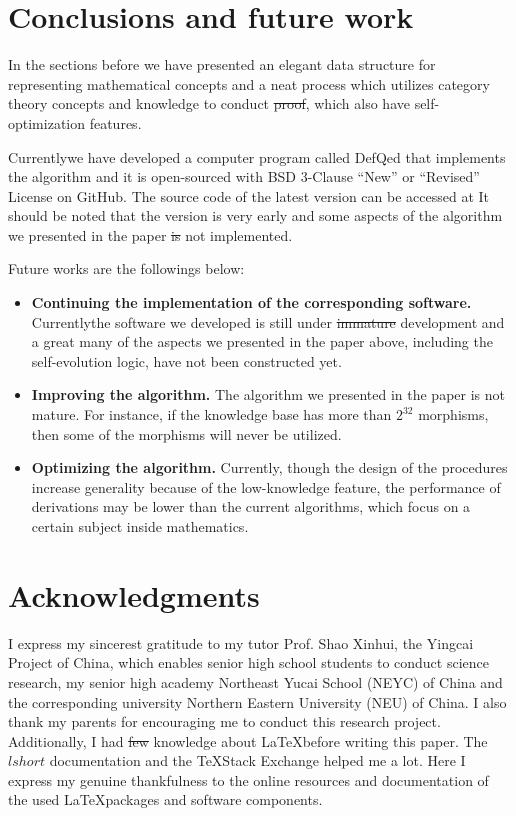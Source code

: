 \documentclass{aims}
\numberwithin{equation}{section}
\numberwithin{theorem}{section}	%
\numberwithin{axiom}{section}	%
\numberwithin{definition}{section}	%
\providecommand{\DIFadd}[1]{{\protect\color{blue}\uwave{#1}}} %
\providecommand{\DIFdel}[1]{{\protect\color{red}\sout{#1}}}                      %
\providecommand{\DIFaddbegin}{} %
\providecommand{\DIFaddend}{} %
\providecommand{\DIFdelbegin}{} %
\providecommand{\DIFdelend}{} %
\begin{document}
	\section{Conclusions and future work}

	In the sections before we have presented an elegant data structure for representing mathematical concepts and a neat process which utilizes category theory concepts and knowledge to conduct \DIFdelbegin \DIFdel{proof}\DIFdelend \DIFaddbegin \DIFadd{proofs}\DIFaddend , which also have self-optimization features.

	Currently\DIFaddbegin \DIFadd{, }\DIFaddend we have developed a computer program called DefQed that implements the algorithm and it is open-sourced with BSD 3-Clause {``}New{''} or {``}Revised{''} License on GitHub. The source code of the latest version can be accessed at \cite{Wang2022}\DIFaddbegin \DIFadd{. }\DIFaddend It should be noted that the version is very early and some aspects of the algorithm we presented in the paper \DIFdelbegin \DIFdel{is }\DIFdelend \DIFaddbegin \DIFadd{are }\DIFaddend not implemented.

	Future works are the followings below:
	\begin{itemize}
		\item \textbf{Continuing the implementation of the corresponding software.} Currently\DIFaddbegin \DIFadd{, }\DIFaddend the software we developed is still under \DIFdelbegin \DIFdel{immature }\DIFdelend \DIFaddbegin \DIFadd{early }\DIFaddend development and a great many of the aspects we presented in the paper above, including the self-evolution logic, have not been constructed yet.
		\item  \textbf{Improving the algorithm.} The algorithm we presented in the paper is not mature. For instance, if the knowledge base has more than \(2^{32}\) morphisms, then some of the morphisms will never be utilized.
		\item \textbf{Optimizing the algorithm.} Currently, though the design of the procedures increase generality because of the low-knowledge feature, the performance of derivations may be lower than the current algorithms, which focus on a certain subject inside mathematics.
	\end{itemize}

	\section*{Acknowledgments}
	I express my sincerest gratitude to my tutor Prof. Shao Xinhui, the Yingcai Project of China, which enables senior high school students to conduct science research, my senior high academy Northeast Yucai School (NEYC) of China and the corresponding university Northern Eastern University (NEU) of China. I also thank my parents for encouraging me to conduct this research project. Additionally, I had \DIFdelbegin \DIFdel{few }\DIFdelend \DIFaddbegin \DIFadd{little }\DIFaddend knowledge about \LaTeX before writing this paper. The $lshort$ documentation and the \TeX Stack Exchange helped me a lot. Here I express my genuine thankfulness to the online resources and documentation of the used \LaTeX packages and software components. 
\end{document}

